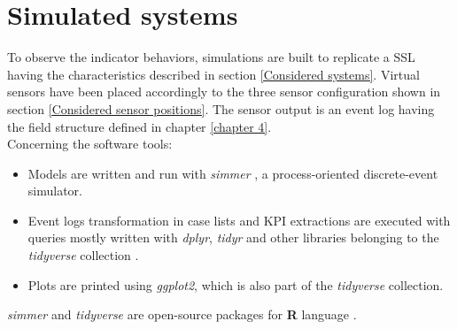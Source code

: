 \chapter{Simulated systems}
\label{chapter 5}

\ifpdf
    \graphicspath{{Chapter5/Figs/}{Chapter5/Figs/PDF/}{Chapter5/Figs/}}
\else
    \graphicspath{{Chapter5/Figs/Vector/}{Chapter5/Figs/}}
\fi
To observe the indicator behaviors, simulations are built to replicate a SSL having the characteristics described in section \ref{Considered systems}. Virtual sensors have been placed accordingly to the three sensor configuration shown in section \ref{Considered sensor positions}. The sensor output is an event log having the field structure defined in chapter \ref{chapter 4}.\\
Concerning the software tools: 
\begin{itemize}
\item Models are written and run with \textit{simmer} \cite{simmer}, a process-oriented discrete-event simulator.
\item Event logs transformation in case lists and KPI extractions are executed with queries mostly written with \textit{dplyr}, \textit{tidyr} and other libraries belonging to the \textit{tidyverse} collection \cite{tidyverse}.
\item Plots are printed using \textit{ggplot2}, which is also part of the \textit{tidyverse} collection.
\end{itemize}
\textit{simmer} and \textit{tidyverse} are open-source packages for \textbf{\textsf{R}} language \cite{Rlanguage}.
